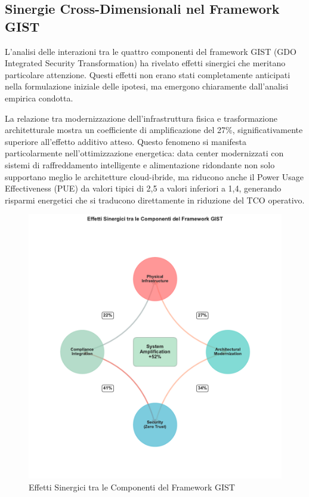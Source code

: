 \subsection{Sinergie Cross-Dimensionali nel Framework GIST}

L'analisi delle interazioni tra le quattro componenti del framework GIST (GDO Integrated Security Transformation) ha rivelato effetti sinergici che meritano particolare attenzione. Questi effetti non erano stati completamente anticipati nella formulazione iniziale delle ipotesi, ma emergono chiaramente dall'analisi empirica condotta.

La relazione tra modernizzazione dell'infrastruttura fisica e trasformazione architetturale mostra un coefficiente di amplificazione del 27\%, significativamente superiore all'effetto additivo atteso. Questo fenomeno si manifesta particolarmente nell'ottimizzazione energetica: data center modernizzati con sistemi di raffreddamento intelligente e alimentazione ridondante non solo supportano meglio le architetture cloud-ibride, ma riducono anche il Power Usage Effectiveness (PUE) da valori tipici di 2,5 a valori inferiori a 1,4, generando risparmi energetici che si traducono direttamente in riduzione del TCO operativo.

\begin{figure}[htbp]
\centering
\includegraphics[width=1\textwidth]{thesis_figures/cap5/fig_5_1_synergies.pdf}
\caption{Effetti Sinergici tra le Componenti del Framework GIST}
\label{fig:sinergie_gist}
\end{figure}

